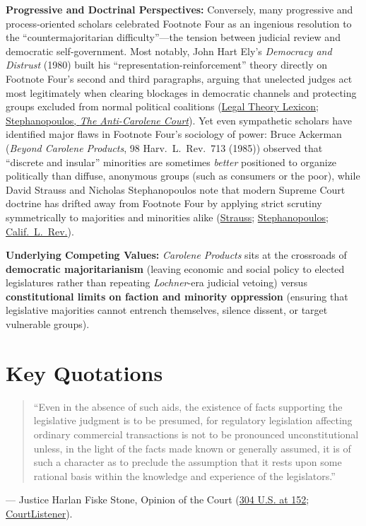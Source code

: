 \documentclass[12pt]{article}
\begin{document}
\textbf{Progressive and Doctrinal Perspectives:} Conversely, many progressive and process-oriented scholars celebrated Footnote Four as an ingenious resolution to the ``countermajoritarian difficulty''---the tension between judicial review and democratic self-government. Most notably, John Hart Ely's \textit{Democracy and Distrust} (1980) built his ``representation-reinforcement'' theory directly on Footnote Four's second and third paragraphs, arguing that unelected judges act most legitimately when clearing blockages in democratic channels and protecting groups excluded from normal political coalitions (\href{https://legaltheorylexicon.com/2026/06/legal-theory-lexicon-constitutional-theory/}{Legal Theory Lexicon}; \href{https://chicagounbound.uchicago.edu/cgi/viewcontent.cgi?article=2224&context=public_law_and_legal_theory}{Stephanopoulos, \textit{The Anti-Carolene Court}}). Yet even sympathetic scholars have identified major flaws in Footnote Four's sociology of power: Bruce Ackerman (\textit{Beyond Carolene Products}, 98 Harv.~L.~Rev.~713 (1985)) observed that ``discrete and insular'' minorities are sometimes \textit{better} positioned to organize politically than diffuse, anonymous groups (such as consumers or the poor), while David Strauss and Nicholas Stephanopoulos note that modern Supreme Court doctrine has drifted away from Footnote Four by applying strict scrutiny symmetrically to majorities and minorities alike (\href{https://chicagounbound.uchicago.edu/cgi/viewcontent.cgi?article=2988&context=journal_articles}{Strauss}; \href{https://chicagounbound.uchicago.edu/cgi/viewcontent.cgi?article=2224&context=public_law_and_legal_theory}{Stephanopoulos}; \href{https://www.californialawreview.org/print/rethinking-political-power-in-judicial-review}{Calif.~L.~Rev.}).

\textbf{Underlying Competing Values:} \textit{Carolene Products} sits at the crossroads of \textbf{democratic majoritarianism} (leaving economic and social policy to elected legislatures rather than repeating \textit{Lochner}-era judicial vetoing) versus \textbf{constitutional limits on faction and minority oppression} (ensuring that legislative majorities cannot entrench themselves, silence dissent, or target vulnerable groups).

\section{Key Quotations}

\begin{quote}
``Even in the absence of such aids, the existence of facts supporting the legislative judgment is to be presumed, for regulatory legislation affecting ordinary commercial transactions is not to be pronounced unconstitutional unless, in the light of the facts made known or generally assumed, it is of such a character as to preclude the assumption that it rests upon some rational basis within the knowledge and experience of the legislators.''
\end{quote}
\noindent --- Justice Harlan Fiske Stone, Opinion of the Court (\href{https://supreme.justia.com/cases/federal/us/304/144/}{304 U.S. at 152}; \href{https://www.courtlistener.com/opinion/103017/united-states-v-carolene-products-co/}{CourtListener}).
\end{document}

